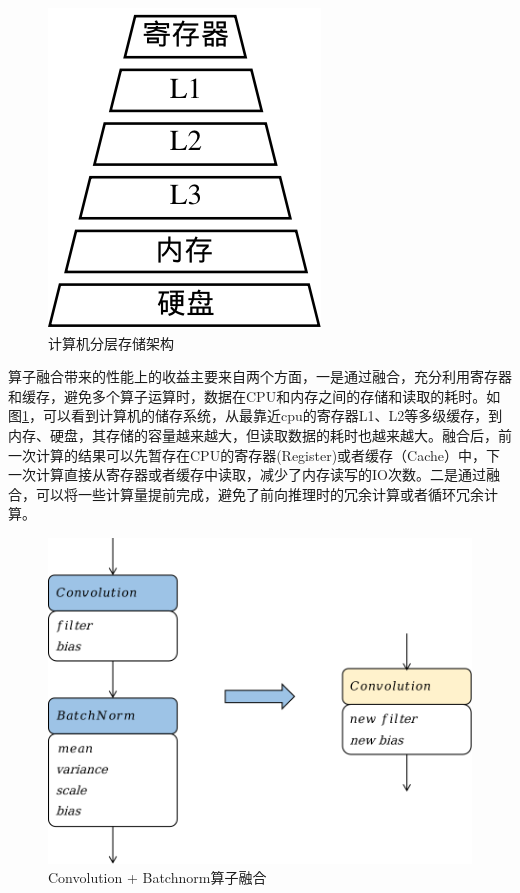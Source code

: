 \begin{figure}[h]
\centering
\includegraphics[scale=0.6]{figs/ch09/ch09-storage.png}
\caption{计算机分层存储架构}
\label{fig:ch09/ch09-fusion-storage}
\end{figure}

算子融合带来的性能上的收益主要来自两个方面，一是通过融合，充分利用寄存器和缓存，避免多个算子运算时，数据在CPU和内存之间的存储和读取的耗时。如图\ref{fig:ch09/ch09-fusion-storage}，可以看到计算机的储存系统，从最靠近cpu的寄存器L1、L2等多级缓存，到内存、硬盘，其存储的容量越来越大，但读取数据的耗时也越来越大。融合后，前一次计算的结果可以先暂存在CPU的寄存器(Register)或者缓存（Cache）中，下一次计算直接从寄存器或者缓存中读取，减少了内存读写的IO次数。二是通过融合，可以将一些计算量提前完成，避免了前向推理时的冗余计算或者循环冗余计算。

\begin{figure}[h]
\centering
\includegraphics[scale=0.6]{figs/ch09/ch09-conv-bn-fusion.png}
\caption{Convolution + Batchnorm算子融合}
\label{fig:ch09/ch09-conv-bn-fusion}
\end{figure}

